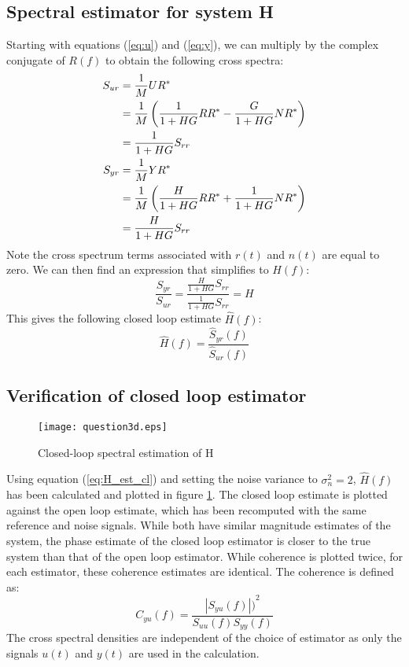 \documentclass[11pt,a4paper]{article}
\begin{document}
\subsection{Spectral estimator for system H}
Starting with equations (\ref{eq:u}) and (\ref{eq:y}), we can multiply by the
complex conjugate of $R(f)$ to obtain the following cross spectra:
\begin{align}
    S_{ur} &= \frac{1}{M}UR^* \notag \\
           &= \frac{1}{M}\left(\frac{1}{1 + HG}RR^* -
                \frac{G}{1 + HG}NR^*\right) \notag \\
           &= \frac{1}{1 + HG}S_{rr} \label{eq:Sur} \\
    S_{yr} &= \frac{1}{M}YR^* \notag \\
           &= \frac{1}{M}\left(\frac{H}{1 + HG}RR^* +
                \frac{1}{1 + HG}NR^*\right) \notag \\
           &= \frac{H}{1 + HG}S_{rr} \label{eq:Srr}
\end{align}
Note the cross spectrum terms associated with $r(t)$ and $n(t)$ are equal to
zero. We can then find an expression that simplifies to $H(f)$:
\begin{equation}
    \frac{S_{yr}}{S_{ur}} =
    \frac{\frac{H}{1 + HG}S_{rr}}{\frac{1}{1 + HG}S_{rr}} = H
\end{equation}
This gives the following closed loop estimate $\hat{H}(f)$:
\begin{equation}
    \hat{H}(f) =
    \frac{\hat{S}_{yr}(f)}{\hat{S}_{ur}(f)} \label{eq:H_est_cl}
\end{equation}


\subsection{Verification of closed loop estimator}
\begin{figure}
    \begin{center}
        \texttt{[image: question3d.eps]}
    \end{center}
    \caption{Closed-loop spectral estimation of H}
    \label{fig:3d}
\end{figure}
Using equation (\ref{eq:H_est_cl}) and setting the noise variance to
$\sigma_n^2 = 2$, $\hat{H}(f)$ has been calculated and plotted in figure
\ref{fig:3d}. The closed loop estimate is plotted against the open loop
estimate, which has been recomputed with the same reference and noise signals.
While both have similar magnitude estimates of the system, the phase estimate
of the closed loop estimator is closer to the true system than that of the open
loop estimator. While coherence is plotted twice, for each estimator, these
coherence estimates are identical. The coherence is defined as:
\begin{equation*}
    C_{yu}(f) = \frac{{|S_{yu}(f)|)}^2}{S_{uu}(f)S_{yy}(f)}
\end{equation*}
The cross spectral densities are independent of the choice of estimator as only
the signals $u(t)$ and $y(t)$ are used in the calculation.
\end{document}
